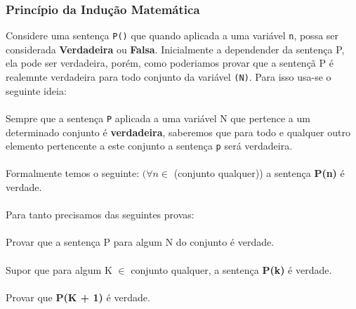 \documentclass[12pt, onecolumn]{article}
\begin{document}
		\subsubsection{Princípio da Indução Matemática}
	
	Considere uma sentença \texttt{P()} que quando aplicada a uma variável 
	\texttt{n}, possa ser considerada \textbf{Verdadeira} ou \textbf{Falsa}.
	Inicialmente a dependender da sentença P, ela pode ser verdadeira, porém,
	como poderiamos provar que a sentençã P é realemnte verdadeira para todo
	conjunto da variável \texttt{(N)}. Para isso usa-se o seguinte ideia:\\
	\\
	Sempre que a sentença \texttt{P} aplicada a uma variável N que pertence a um
	determinado conjunto é \textbf{verdadeira}, saberemos que para todo
	e qualquer outro elemento pertencente a este conjunto a sentença \texttt{p}
	será verdadeira.\\
	\\
	Formalmente temos o seguinte: $(\forall n \in$ (conjunto qualquer))
	a sentença \textbf{P(n)} é verdade. \\
	\\
	Para tanto precisamos das seguintes provas: \\
	\\
	Provar que a sentença P para algum N do conjunto é verdade.\\
	\\
	Supor que para algum K $\in$ conjunto qualquer, 
	a sentença \textbf{P(k)} é verdade.\\
	\\
	Provar que \textbf{P(K + 1)} é verdade.
	


	
        
\end{document}
